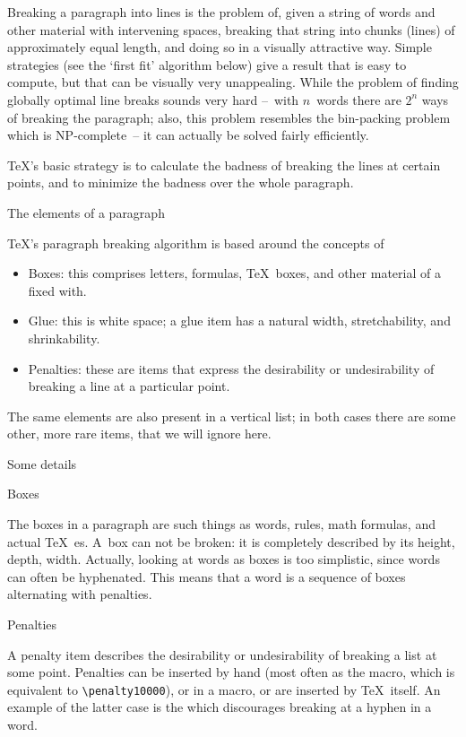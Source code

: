 Breaking a paragraph into lines is the problem of, given a string of
words and other material with intervening spaces, breaking that string
into chunks (lines) of approximately equal length, and doing so in a
visually attractive way. Simple strategies (see the `first fit'
algorithm below) give a result that is easy to compute, but that can
be visually very unappealing. While the problem of finding globally
optimal line breaks sounds very hard --~with $n$~words there are $2^n$
ways of breaking the paragraph; also, this problem resembles the
bin-packing problem which is NP-complete~-- it can actually be solved
fairly efficiently.

\TeX's basic strategy is to calculate the badness of breaking the
lines at certain points, and to minimize the badness over the whole
paragraph.

 {The elements of a paragraph}

\TeX's paragraph breaking algorithm is based around the concepts of
\begin{itemize}
\item Boxes: this comprises letters, formulas, \TeX\ boxes, and other
  material of a fixed with.
\item Glue: this is white space; a glue item has a natural width,
  stretchability, and shrinkability.
\item Penalties: these are items that express the desirability or
  undesirability of breaking a line at a particular point.
\end{itemize}
The same elements are also present in a vertical list; in both cases
there are some other, more rare items, that we will ignore here.

 {Some details}

 {Boxes}

The boxes in a paragraph are such things as words, rules, math
formulas, and actual \TeX\ es. A~box can not be broken: it is
completely described by its height, depth, width. Actually, looking at
words as boxes is too simplistic, since words can often be
hyphenated. This means that a word is a sequence of boxes alternating
with penalties.

 {Penalties}

A penalty item describes the desirability or undesirability of
breaking a list at some point. Penalties can be inserted by hand (most
often as the  macro, which is equivalent to
\verb+\penalty10000+), or in a macro, or are inserted
by \TeX\ itself. An example of the latter case is the
 which discourages breaking at a hyphen in a word.

